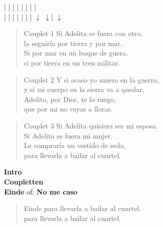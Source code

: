 
|  \hspace{2em} | \hspace{3em} |  \hspace{2em} | \hspace{3em} |  \hspace{1em} | \hspace{3em} |  \hspace{2em} |  \hspace{1em} \\
|  \hspace{2em} | \hspace{3em} |  \hspace{2em} | \hspace{3em} |  \hspace{1em} | \hspace{3em} | $\downarrow$ $\downarrow$| $\downarrow$
\\
\begin{verse}{Couplet 1}
Si Adelita se fuera con otro,\\
la seguir\'ia por tierra y por mar.\\
Si por mar en un buque de guera,\\
si por tierra en un tren militar.\\
\end{verse}

\begin{verse}{Couplet 2}
Y si acaso yo muero en la guerra,\\
y si mi cuerpo en la sierra va a quedar,\\
Adelita, por Dios, te lo ruego,\\
que por mi no vayas a llorar.\\
\end{verse}

\begin{verse}{Couplet 3}
Si Adelita quisiera ser mi esposa.\\
Si Adelita se fuera mi mujer.\\
Le comprar\'ia un vestido de seda,\\
para llevarla a bailar al cuartel.\\
\end{verse}

\textbf {Intro} \\
\textbf {Coupletten}\\
\vspace{1.25ex}
\textbf{Einde} of: \textbf{ No me caso}\\
\begin{verse}{Einde}
para llevarla a bailar al cuartel.\\
para llevarla a bailar al cuartel.\\
\end{verse}